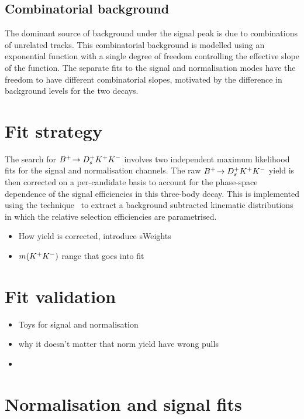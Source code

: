 \subsection{Combinatorial  background}
\label{sec:B2DsKK_combcomps}

The dominant source of background under the signal peak is due to combinations of unrelated tracks. This combinatorial background is modelled using an exponential function with a single degree of freedom controlling the effective slope of the function. The separate fits to the signal and normalisation modes have the freedom to have different combinatorial slopes, motivated by the difference in background levels for the two decays.

\section{Fit strategy}
\label{sec:B2DsKK_fitstrategy}
The search for ${{{B}^+}}\!\rightarrow {\ensuremath{{D}^+_{s}}}{\ensuremath{{K}^+}}{\ensuremath{{K}^-}}$ involves two independent maximum likelihood fits for the signal and normalisation channels. The raw ${{{B}^+}}\!\rightarrow {\ensuremath{{D}^+_{s}}}{\ensuremath{{K}^+}}{\ensuremath{{K}^-}}$ yield is then corrected on a per-candidate basis to account for the phase-space dependence of the signal efficiencies in this three-body decay. This is implemented using the \sPlot technique~\cite{Pivk:2004ty} to extract a background subtracted kinematic distributions in which the relative selection efficiencies are parametrised.  


{\color{Red}
\begin{itemize}
\item How yield is corrected, introduce sWeights
\item $m({{K}^+}{{K}^-})$ range that goes into fit
\end{itemize}
}



\section{Fit validation}
\label{sec:B2DsKK_fitvalidation}

{\color{Red}
\begin{itemize}
\item Toys for signal and normalisation
\item why it doesn't matter that norm yield have wrong pulls
\item 
\end{itemize}
}

\section{Normalisation and signal fits}

